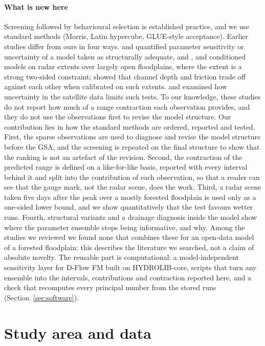 \documentclass[preprint,12pt,authoryear]{elsarticle}
\begin{document}
\paragraph{What is new here}
Screening followed by behavioural selection is established practice, and we use standard methods (Morris, Latin hypercube, GLUE-style acceptance). Earlier studies differ from ours in four ways. \citet{hall2005} and \citet{pappenberger2005} quantified parameter sensitivity or uncertainty of a model taken as structurally adequate, and \citet{aronica2002}, \citet{bates2004} and \citet{wood2016} conditioned models on radar extents over largely open floodplains, where the extent is a strong two-sided constraint; \citet{wood2016} showed that channel depth and friction trade off against each other when calibrated on such extents. \citet{stephens2012} and \citet{schumann2009} examined how uncertainty in the satellite data limits such tests. To our knowledge, these studies do not report how much of a range contraction each observation provides, and they do not use the observations first to revise the model structure. Our contribution lies in how the standard methods are ordered, reported and tested. First, the sparse observations are used to diagnose and revise the model structure before the GSA, and the screening is repeated on the final structure to show that the ranking is not an artefact of the revision. Second, the contraction of the predicted range is defined on a like-for-like basis, reported with every interval behind it and split into the contribution of each observation, so that a reader can see that the gauge mark, not the radar scene, does the work. Third, a radar scene taken five days after the peak over a mostly forested floodplain is used only as a one-sided lower bound, and we show quantitatively that the test favours wetter runs. Fourth, structural variants and a drainage diagnosis inside the model show where the parameter ensemble stops being informative, and why. Among the studies we reviewed we found none that combines these for an open-data model of a forested floodplain; this describes the literature we searched, not a claim of absolute novelty. The reusable part is computational: a model-independent sensitivity layer for D-Flow FM built on HYDROLIB-core, scripts that turn any ensemble into the intervals, contributions and contraction reported here, and a check that recomputes every principal number from the stored runs (Section~\ref{sec:software}).

\section{Study area and data}
\label{sec:data}
\end{document}
